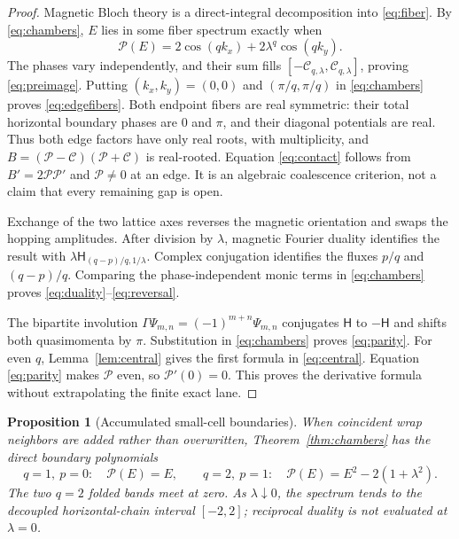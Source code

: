 \documentclass[10pt]{article}
\newtheorem{proposition}{Proposition}
\newcommand{\HH}{\mathsf H}
\newcommand{\PP}{\mathcal P}
\newcommand{\CC}{\mathcal C}
\begin{document}
\begin{proof}
Magnetic Bloch theory is a direct-integral decomposition into
\eqref{eq:fiber}.  By \eqref{eq:chambers}, $E$ lies in some fiber spectrum
exactly when
\[
 \PP(E)=2\cos(qk_x)+2\lambda^q\cos(qk_y).
\]
The phases vary independently, and their sum fills
$[-\CC_{q,\lambda},\CC_{q,\lambda}]$, proving \eqref{eq:preimage}.
Putting $(k_x,k_y)=(0,0)$ and $(\pi/q,\pi/q)$ in
\eqref{eq:chambers} proves \eqref{eq:edgefibers}.  Both endpoint fibers
are real symmetric: their total horizontal boundary phases are $0$ and
$\pi$, and their diagonal potentials are real.  Thus both edge factors
have only real roots, with multiplicity, and
$B=(\PP-\CC)(\PP+\CC)$ is real-rooted.  Equation \eqref{eq:contact} follows from
$B'=2\PP\PP'$ and $\PP\ne0$ at an edge.  It is an algebraic
coalescence criterion, not a claim that every remaining gap is open.

Exchange of the two lattice axes reverses the magnetic orientation and
swaps the hopping amplitudes.  After division by $\lambda$, magnetic
Fourier duality identifies the result with
$\lambda\HH_{(q-p)/q,1/\lambda}$.  Complex conjugation identifies the
fluxes $p/q$ and $(q-p)/q$.  Comparing the phase-independent monic terms
in \eqref{eq:chambers} proves \eqref{eq:duality}--\eqref{eq:reversal}.

The bipartite involution
$\Gamma\Psi_{m,n}=(-1)^{m+n}\Psi_{m,n}$ conjugates $\HH$ to $-\HH$ and
shifts both quasimomenta by $\pi$.  Substitution in
\eqref{eq:chambers} proves \eqref{eq:parity}.  For even $q$,
Lemma~\ref{lem:central} gives the first formula in \eqref{eq:central}.
Equation \eqref{eq:parity} makes $\PP$ even, so $\PP'(0)=0$.  This proves
the derivative formula without extrapolating the finite exact lane.
\end{proof}

\begin{proposition}[Accumulated small-cell boundaries]\label{prop:small}
When coincident wrap neighbors are added rather than overwritten,
Theorem~\ref{thm:chambers} has the direct boundary polynomials
\begin{equation}
 q=1,\ p=0:\quad \PP(E)=E,
 \qquad
 q=2,\ p=1:\quad \PP(E)=E^2-2(1+\lambda^2).
 \label{eq:small}
\end{equation}
The two $q=2$ folded bands meet at zero.  As $\lambda\downarrow0$, the
spectrum tends to the decoupled horizontal-chain interval $[-2,2]$;
reciprocal duality is not evaluated at $\lambda=0$.
\end{proposition}
\end{document}
